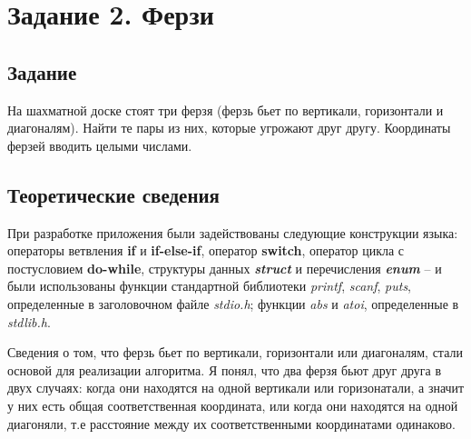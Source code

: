 \documentclass[12pt,a4paper]{report}
\begin{document}
\section{Задание 2. Ферзи}

\subsection{Задание}
\hspace{\parindent}
На шахматной доске стоят три ферзя (ферзь бьет по вертикали, горизонтали и диагоналям). Найти те пары из них, которые угрожают друг другу. Координаты ферзей вводить целыми числами.
\subsection{Теоретические сведения}
\hspace{\parindent}
При разработке приложения были задействованы следующие конструкции языка: операторы ветвления \textbf{if} и \textbf{if-else-if}, оператор \textbf{switch}, оператор цикла с постусловием \textbf{do-while}, структуры данных \textbf{\textit{struct}} и перечисления \textit{\textbf{enum}} -- и были использованы функции стандартной библиотеки \textit{printf}, \textit{scanf}, \textit{puts}, определенные в заголовочном файле \textit{stdio.h}; функции \textit{abs} и \textit{atoi}, определенные в \textit{stdlib.h}.

\hspace{\parindent}
Сведения о том, что ферзь бьет по вертикали, горизонтали или диагоналям, стали основой для реализации алгоритма. Я понял, что два ферзя бьют друг друга в двух случаях: когда они находятся на одной вертикали или горизонатали, а значит у них есть общая соответственная координата, или когда они находятся на одной диагоняли, т.е расстояние между их соответственными координатами одинаково.
\end{document}
